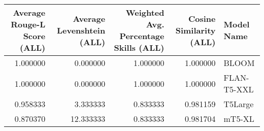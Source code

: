 \begin{tabular}{rrrrl}
\toprule
Average Rouge-L Score (ALL) & Average Levenshtein (ALL) & Weighted Avg. Percentage Skills (ALL) & Cosine Similarity (ALL) & Model Name \\
\midrule
1.000000 & 0.000000 & 1.000000 & 1.000000 & BLOOM \\
1.000000 & 0.000000 & 1.000000 & 1.000000 & FLAN-T5-XXL \\
0.958333 & 3.333333 & 0.833333 & 0.981159 & T5Large \\
0.870370 & 12.333333 & 0.833333 & 0.981704 & mT5-XL \\
\bottomrule
\end{tabular}
